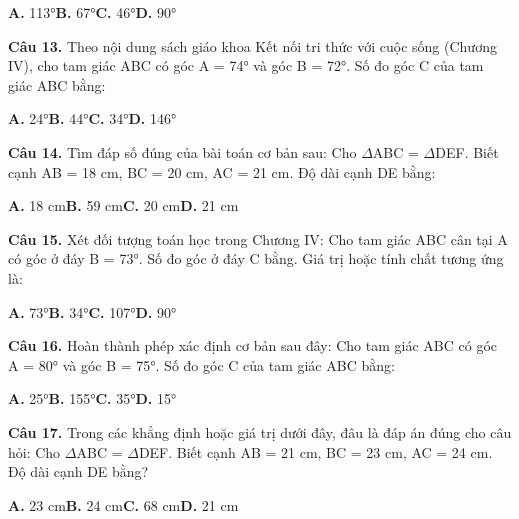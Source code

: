 \documentclass[11pt,a4paper]{article}
\begin{document}
\hspace*{1.5em}\textbf{A.} 113°\quad\quad \textbf{B.} 67°\quad\quad \textbf{C.} 46°\quad\quad \textbf{D.} 90°\par\vspace{2pt}
\textbf{\color{primary} Câu 13.} Theo nội dung sách giáo khoa Kết nối tri thức với cuộc sống (Chương IV), cho tam giác ABC có góc A = 74° và góc B = 72°. Số đo góc C của tam giác ABC bằng:\par
\hspace*{1.5em}\textbf{A.} 24°\quad\quad \textbf{B.} 44°\quad\quad \textbf{C.} 34°\quad\quad \textbf{D.} 146°\par\vspace{2pt}
\textbf{\color{primary} Câu 14.} Tìm đáp số đúng của bài toán cơ bản sau: Cho $\Delta$ABC = $\Delta$DEF. Biết cạnh AB = 18 cm, BC = 20 cm, AC = 21 cm. Độ dài cạnh DE bằng:\par
\hspace*{1.5em}\textbf{A.} 18 cm\quad\quad \textbf{B.} 59 cm\quad\quad \textbf{C.} 20 cm\quad\quad \textbf{D.} 21 cm\par\vspace{2pt}
\textbf{\color{primary} Câu 15.} Xét đối tượng toán học trong Chương IV: Cho tam giác ABC cân tại A có góc ở đáy B = 73°. Số đo góc ở đáy C bằng. Giá trị hoặc tính chất tương ứng là:\par
\hspace*{1.5em}\textbf{A.} 73°\quad\quad \textbf{B.} 34°\quad\quad \textbf{C.} 107°\quad\quad \textbf{D.} 90°\par\vspace{2pt}
\textbf{\color{primary} Câu 16.} Hoàn thành phép xác định cơ bản sau đây: Cho tam giác ABC có góc A = 80° và góc B = 75°. Số đo góc C của tam giác ABC bằng:\par
\hspace*{1.5em}\textbf{A.} 25°\quad\quad \textbf{B.} 155°\quad\quad \textbf{C.} 35°\quad\quad \textbf{D.} 15°\par\vspace{2pt}
\textbf{\color{primary} Câu 17.} Trong các khẳng định hoặc giá trị dưới đây, đâu là đáp án đúng cho câu hỏi: Cho $\Delta$ABC = $\Delta$DEF. Biết cạnh AB = 21 cm, BC = 23 cm, AC = 24 cm. Độ dài cạnh DE bằng?\par
\hspace*{1.5em}\textbf{A.} 23 cm\quad\quad \textbf{B.} 24 cm\quad\quad \textbf{C.} 68 cm\quad\quad \textbf{D.} 21 cm\par\vspace{2pt}
\end{document}
